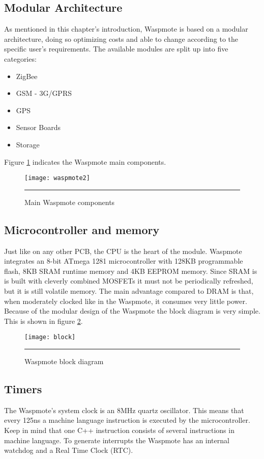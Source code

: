 \subsection{Modular Architecture}
As mentioned in this chapter's introduction, Waspmote is based on a modular architecture, doing so optimizing costs and able to change according to the specific user's requirements. The available modules are split up into five categories:
\begin{itemize}
\item ZigBee
\item GSM - 3G/GPRS
\item GPS
\item Sensor Boards
\item Storage
\end{itemize}  
Figure \ref{fig:waspMote1} indicates the Waspmote main components.
\begin{figure}[ht]
\centering
\texttt{[image: waspmote2]}
\rule{30em}{0.5pt}
\caption{Main Waspmote components}
\label{fig:waspMote1}
\end{figure}
\subsection{Microcontroller and memory}
Just like on any other PCB, the CPU is the heart of the module. Waspmote integrates an 8-bit ATmega 1281 microcontroller with 128KB programmable flash, 8KB SRAM runtime memory and 4KB EEPROM memory. Since SRAM is is built with cleverly combined MOSFETs it must not be periodically refreshed, but it is still volatile memory. The main advantage compared to DRAM is that, when moderately clocked like in the Waspmote, it consumes very little power.\\
Because of the modular design of the Waspmote the block diagram is very simple. This is shown in figure \ref{fig:block}.
\begin{figure}[ht]
\centering
\texttt{[image: block]}
\rule{30em}{0.5pt}
\caption{Waspmote block diagram}
\label{fig:block}
\end{figure}
\subsection{Timers}
The Waspmote's system clock is an 8MHz quartz oscillator. This means that every 125ns a machine language instruction is executed by the microcontroller. Keep in mind that one C++ instruction consists of several instructions in machine language. To generate interrupts the Waspmote has an internal watchdog and a Real Time Clock (RTC).
